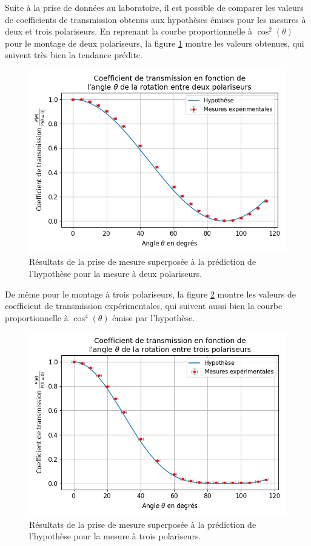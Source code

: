 \documentclass[11pt,letterpaper]{article}
\begin{document}
Suite à la prise de données au laboratoire, il est possible de comparer les valeurs de
coefficients de transmission obtenus aux hypothèses émises pour les mesures à deux et trois polariseurs.
En reprenant la courbe proportionnelle à $\cos^{2}\left( \theta \right)$ pour le montage de
deux polariseurs, la figure \ref{2pol} montre les valeurs obtenues, qui suivent très bien la
tendance prédite.

\begin{figure}[H]
  \centering
  \includegraphics[scale=0.75]{viz_deux_pol.png}
  \caption{Résultats de la prise de mesure superposée à la prédiction de l'hypothèse pour la 
  mesure à deux polariseurs.}
  \label{2pol}
\end{figure}

De même pour le montage à trois polariseurs, la figure \ref{3pol} montre les valeurs de coefficient
de transmission expérimentales, qui suivent aussi bien la courbe proportionnelle à 
$\cos^{4}\left( \theta \right)$ émise par l'hypothèse.

\begin{figure}[H]
  \centering
  \includegraphics[scale=0.75]{viz_trois_pol.png}
  \caption{Résultats de la prise de mesure superposée à la prédiction de l'hypothèse pour la 
  mesure à trois polariseurs.}
  \label{3pol}
\end{figure}
\end{document}

